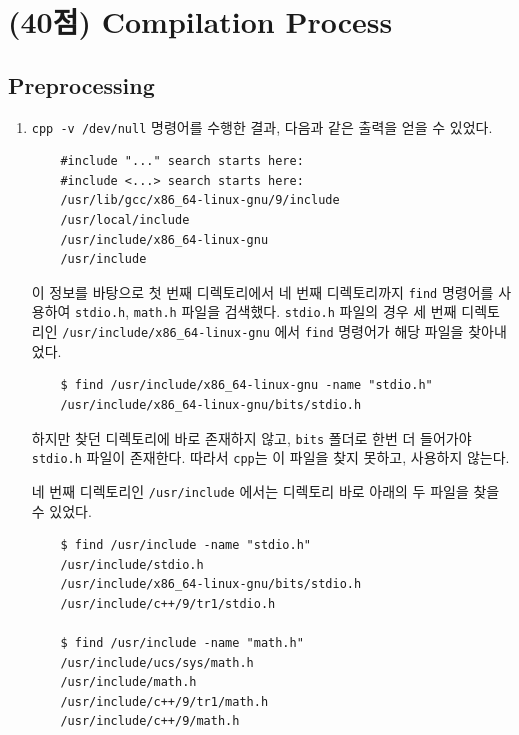 \section{(40점) Compilation Process}

\subsection{Preprocessing}

\begin{enumerate}[label= (\alph*)]
    \item {
        \texttt{cpp -v /dev/null} 명령어를 수행한 결과, 다음과 같은 출력을 얻을 수 있었다.

        \begin{verbatim}
    #include "..." search starts here:
    #include <...> search starts here:
    /usr/lib/gcc/x86_64-linux-gnu/9/include
    /usr/local/include
    /usr/include/x86_64-linux-gnu
    /usr/include
        \end{verbatim}

        이 정보를 바탕으로 첫 번째 디렉토리에서 네 번째 디렉토리까지 \texttt{find} 명령어를 사용하여
        \texttt{stdio.h}, \texttt{math.h} 파일을 검색했다.
        \texttt{stdio.h} 파일의 경우 세 번째 디렉토리인 \texttt{/usr/include/x86\_64-linux-gnu} 에서
        \texttt{find} 명령어가 해당 파일을 찾아내었다.

        \begin{verbatim}
    $ find /usr/include/x86_64-linux-gnu -name "stdio.h"
    /usr/include/x86_64-linux-gnu/bits/stdio.h
        \end{verbatim}

        하지만 찾던 디렉토리에 바로 존재하지 않고, \texttt{bits} 폴더로 한번 더 들어가야
        \texttt{stdio.h} 파일이 존재한다. 따라서 \texttt{cpp}는 이 파일을 찾지 못하고, 사용하지 않는다.

        네 번째 디렉토리인 \texttt{/usr/include} 에서는 디렉토리 바로 아래의 두 파일을 찾을 수 있었다.

        \begin{verbatim}
    $ find /usr/include -name "stdio.h"
    /usr/include/stdio.h
    /usr/include/x86_64-linux-gnu/bits/stdio.h
    /usr/include/c++/9/tr1/stdio.h
    
    $ find /usr/include -name "math.h"
    /usr/include/ucs/sys/math.h
    /usr/include/math.h
    /usr/include/c++/9/tr1/math.h
    /usr/include/c++/9/math.h
        \end{verbatim}

}
\end{enumerate}
